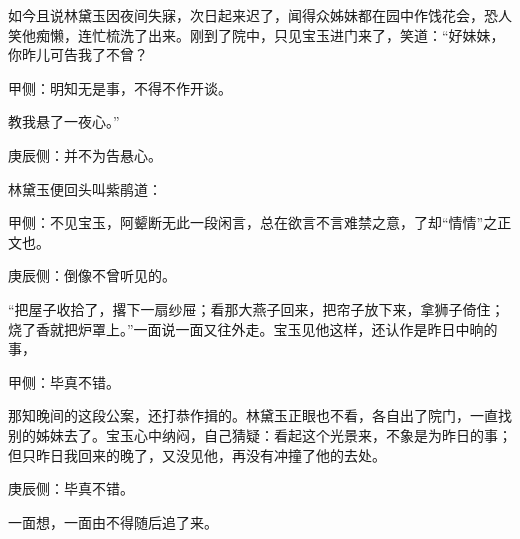 \begin{parag}
    如今且说林黛玉因夜间失寐，次日起来迟了，闻得众姊妹都在园中作饯花会，恐人笑他痴懒，连忙梳洗了出来。刚到了院中，只见宝玉进门来了，笑道：“好妹妹，你昨儿可告我了不曾？\begin{note}甲侧：明知无是事，不得不作开谈。\end{note}教我悬了一夜心。”\begin{note}庚辰侧：并不为告悬心。\end{note}林黛玉便回头叫紫鹃道：\begin{note}甲侧：不见宝玉，阿颦断无此一段闲言，总在欲言不言难禁之意，了却“情情”之正文也。\end{note}\begin{note}庚辰侧：倒像不曾听见的。\end{note}“把屋子收拾了，撂下一扇纱屉；看那大燕子回来，把帘子放下来，拿狮子倚住；烧了香就把炉罩上。”一面说一面又往外走。宝玉见他这样，还认作是昨日中晌的事，\begin{note}甲侧：毕真不错。\end{note}那知晚间的这段公案，还打恭作揖的。林黛玉正眼也不看，各自出了院门，一直找别的姊妹去了。宝玉心中纳闷，自己猜疑：看起这个光景来，不象是为昨日的事；但只昨日我回来的晚了，又没见他，再没有冲撞了他的去处。\begin{note}庚辰侧：毕真不错。\end{note}一面想，一面由不得随后追了来。
\end{parag}


